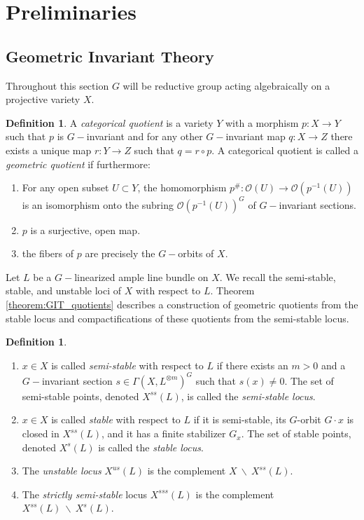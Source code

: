 \documentclass{amsart}
\newcommand{\mc}{\mathcal}
\numberwithin{equation}{section}
\theoremstyle{definition}
\newtheorem{defn}[prop]{Definition}
\begin{document}
\tableofcontents


\section{Preliminaries}

\subsection{Geometric Invariant Theory}

Throughout this section $G$ will be reductive group acting algebraically on a projective variety $X$.



\begin{defn} A \textit{categorical quotient} is a variety $Y$ with a morphism $p:X \rightarrow Y$ such that $p$ is $G-$invariant and for any other $G-$invariant map $q:X \rightarrow Z$ there exists a unique map $r: Y \rightarrow Z$ such that $q = r \circ p$. A categorical quotient is called a \textit{geometric quotient} if furthermore:
\begin{enumerate}[label=\arabic*)]
    \item For any open subset $U \subset Y$, the homomorphism $p^{\#}: \mc{O}(U) \rightarrow \mc{O}(p^{-1}(U))$ is an isomorphism onto the subring $\mc{O}(p^{-1}(U))^G$ of $G-$invariant sections.
    \item $p$ is a surjective, open map.
    \item the fibers of $p$ are precisely the $G-$orbits of $X$.
\end{enumerate}
\end{defn}

Let $L$ be a $G-$linearized ample line bundle on $X$. We recall the semi-stable, stable, and unstable loci of $X$ with respect to $L$. Theorem \ref{theorem:GIT_quotients} describes a construction of geometric quotients from the stable locus and compactifications of these quotients from the semi-stable locus.

\begin{defn}\label{def:stability}
    \begin{enumerate}[label=\roman*)]
        \item $x \in X$ is called \textit{semi-stable} with respect to $L$ if there exists an $m>0$ and a $G-$invariant section $s \in \Gamma(X, L^{\otimes m})^G$ such that $s(x) \neq 0$. The set of semi-stable points, denoted $X^{ss}(L)$, is called the \textit{semi-stable locus}.
        \item $x \in X$ is called \textit{stable} with respect to $L$ if it is semi-stable, its $G$-orbit $G \cdot x$ is closed in $X^{ss}(L)$, and it has a finite stabilizer $G_x$. The set of stable points, denoted $X^s (L)$ is called the \textit{stable locus}.
        \item The \textit{unstable locus} $X^{us}(L)$ is the complement $X \ \backslash \  X^{ss}(L)$.
        \item The \textit{strictly semi-stable} locus $X^{sss}(L)$ is the complement $X^{ss}(L) \ \backslash \ X^s(L)$.
    \end{enumerate}
\end{defn}
\end{document}
